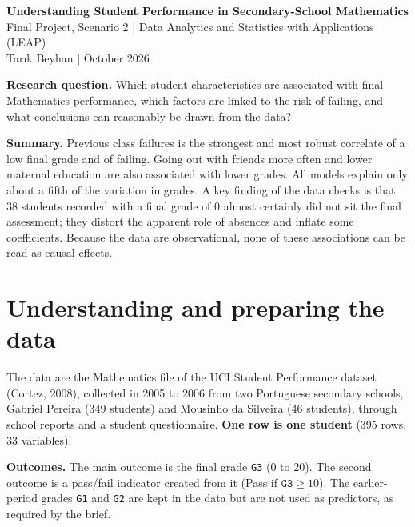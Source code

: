 \documentclass[11pt,a4paper]{article}
\begin{document}
\begin{center}
{\LARGE\bfseries Understanding Student Performance in Secondary-School Mathematics}\\[0.6ex]
{\large Final Project, Scenario 2 \;|\; Data Analytics and Statistics with Applications (LEAP)}\\[0.4ex]
Tarık Beyhan \;|\; October 2026
\end{center}

\noindent\textbf{Research question.} Which student characteristics are associated with final Mathematics performance, which factors are linked to the risk of failing, and what conclusions can reasonably be drawn from the data?

\noindent\textbf{Summary.} Previous class failures is the strongest and most robust correlate of a low final grade and of failing. Going out with friends more often and lower maternal education are also associated with lower grades. All models explain only about a fifth of the variation in grades. A key finding of the data checks is that 38 students recorded with a final grade of 0 almost certainly did not sit the final assessment; they distort the apparent role of absences and inflate some coefficients. Because the data are observational, none of these associations can be read as causal effects.

\section{Understanding and preparing the data}

The data are the Mathematics file of the UCI Student Performance dataset (Cortez, 2008), collected in 2005 to 2006 from two Portuguese secondary schools, Gabriel Pereira (349 students) and Mousinho da Silveira (46 students), through school reports and a student questionnaire. \textbf{One row is one student} (395 rows, 33 variables).

\textbf{Outcomes.} The main outcome is the final grade \texttt{G3} (0 to 20). The second outcome is a pass/fail indicator created from it (Pass if $\texttt{G3} \geq 10$). The earlier-period grades \texttt{G1} and \texttt{G2} are kept in the data but are not used as predictors, as required by the brief.
\end{document}
